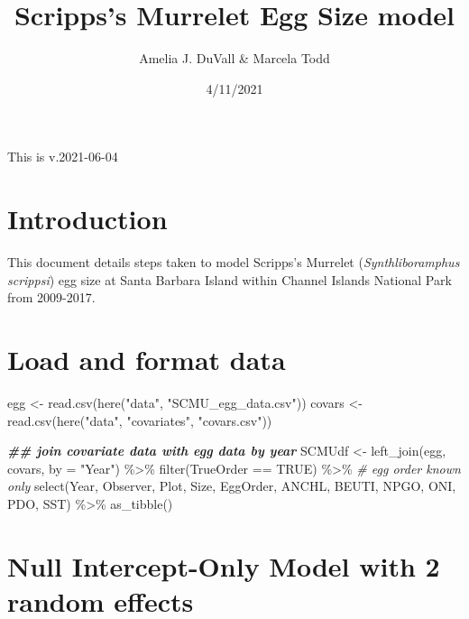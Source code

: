 \documentclass[
]{article}
\title{Scripps's Murrelet Egg Size model}
\author{Amelia J. DuVall \& Marcela Todd}
\date{4/11/2021}
\newenvironment{Shaded}{\begin{snugshade}}{\end{snugshade}}
\newcommand{\AttributeTok}[1]{\textcolor[rgb]{0.77,0.63,0.00}{#1}}
\newcommand{\CommentTok}[1]{\textcolor[rgb]{0.56,0.35,0.01}{\textit{#1}}}
\newcommand{\ConstantTok}[1]{\textcolor[rgb]{0.00,0.00,0.00}{#1}}
\newcommand{\DocumentationTok}[1]{\textcolor[rgb]{0.56,0.35,0.01}{\textbf{\textit{#1}}}}
\newcommand{\FunctionTok}[1]{\textcolor[rgb]{0.00,0.00,0.00}{#1}}
\newcommand{\NormalTok}[1]{#1}
\newcommand{\OtherTok}[1]{\textcolor[rgb]{0.56,0.35,0.01}{#1}}
\newcommand{\SpecialCharTok}[1]{\textcolor[rgb]{0.00,0.00,0.00}{#1}}
\newcommand{\StringTok}[1]{\textcolor[rgb]{0.31,0.60,0.02}{#1}}
\begin{document}
\maketitle

This is v.2021-06-04

\hypertarget{introduction}{%
\section{Introduction}\label{introduction}}

This document details steps taken to model Scripps's Murrelet
(\emph{Synthliboramphus scrippsi}) egg size at Santa Barbara Island
within Channel Islands National Park from 2009-2017.

\hypertarget{load-and-format-data}{%
\section{Load and format data}\label{load-and-format-data}}

\begin{Shaded}
\begin{Highlighting}[]
\NormalTok{egg }\OtherTok{\textless{}{-}} \FunctionTok{read.csv}\NormalTok{(}\FunctionTok{here}\NormalTok{(}\StringTok{"data"}\NormalTok{, }\StringTok{"SCMU\_egg\_data.csv"}\NormalTok{)) }
\NormalTok{covars }\OtherTok{\textless{}{-}} \FunctionTok{read.csv}\NormalTok{(}\FunctionTok{here}\NormalTok{(}\StringTok{"data"}\NormalTok{, }\StringTok{"covariates"}\NormalTok{, }\StringTok{"covars.csv"}\NormalTok{))}

\DocumentationTok{\#\# join covariate data with egg data by year}
\NormalTok{SCMUdf }\OtherTok{\textless{}{-}} \FunctionTok{left\_join}\NormalTok{(egg, covars, }\AttributeTok{by =} \StringTok{"Year"}\NormalTok{) }\SpecialCharTok{\%\textgreater{}\%}
  \FunctionTok{filter}\NormalTok{(TrueOrder }\SpecialCharTok{==} \ConstantTok{TRUE}\NormalTok{) }\SpecialCharTok{\%\textgreater{}\%} \CommentTok{\# egg order known only}
  \FunctionTok{select}\NormalTok{(Year, Observer, Plot, Size, EggOrder, ANCHL, BEUTI, NPGO, ONI, PDO, SST) }\SpecialCharTok{\%\textgreater{}\%}
  \FunctionTok{as\_tibble}\NormalTok{()}
\end{Highlighting}
\end{Shaded}

\hypertarget{null-intercept-only-model-with-2-random-effects}{%
\section{Null Intercept-Only Model with 2 random
effects}\label{null-intercept-only-model-with-2-random-effects}}
\end{document}
